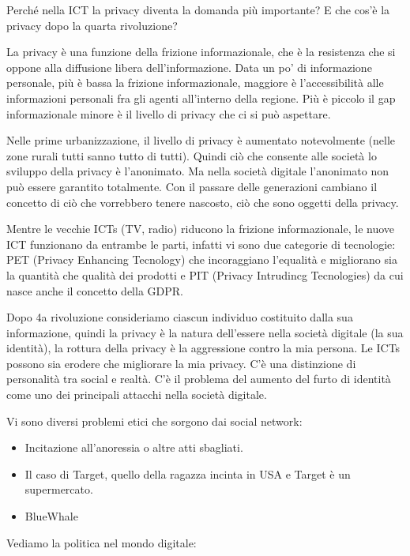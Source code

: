 \documentclass[a4page, 11pt]{article}
\begin{document}
Perché nella ICT la privacy diventa la domanda più importante? E che
cos'è la privacy dopo la quarta rivoluzione?

La privacy è una funzione della frizione informazionale, che è la
resistenza che si oppone alla diffusione libera dell'informazione. Data
un po' di informazione personale, più è bassa la frizione
informazionale, maggiore è l'accessibilità alle informazioni personali
fra gli agenti all'interno della regione. Più è piccolo il gap
informazionale minore è il livello di privacy che ci si può aspettare.

Nelle prime urbanizzazione, il livello di privacy è aumentato
notevolmente (nelle zone rurali tutti sanno tutto di tutti). Quindi ciò
che consente alle società lo sviluppo della privacy è l'anonimato. Ma
nella società digitale l'anonimato non può essere garantito totalmente.
Con il passare delle generazioni cambiano il concetto di ciò che
vorrebbero tenere nascosto, ciò che sono oggetti della privacy.

Mentre le vecchie ICTs (TV, radio) riducono la frizione informazionale,
le nuove ICT funzionano da entrambe le parti, infatti vi sono due
categorie di tecnologie: PET (Privacy Enhancing Tecnology) che
incoraggiano l'equalità e migliorano sia la quantità che qualità dei
prodotti e PIT (Privacy Intrudincg Tecnologies) da cui nasce anche il
concetto della GDPR.

Dopo 4a rivoluzione consideriamo ciascun individuo costituito dalla sua
informazione, quindi la privacy è la natura dell'essere nella società
digitale (la sua identità), la rottura della privacy è la aggressione
contro la mia persona. Le ICTs possono sia erodere che migliorare la mia
privacy. C'è una distinzione di personalità tra social e realtà. C'è il
problema del aumento del furto di identità come uno dei principali
attacchi nella società digitale.

Vi sono diversi problemi etici che sorgono dai social network:

\begin{itemize}
	 
	\item
	Incitazione all'anoressia o altre atti sbagliati.
	\item
	Il caso di Target, quello della ragazza incinta in USA e Target è un
	supermercato.
	\item
	BlueWhale
\end{itemize}

Vediamo la politica nel mondo digitale:
\end{document}
